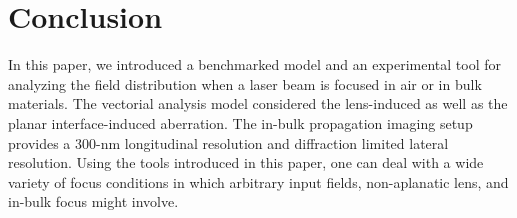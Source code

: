 \documentclass[9pt,twocolumn,twoside]{osajnl}
\begin{document}

\section{Conclusion}
In this paper, we introduced a benchmarked model and an experimental tool for analyzing the field distribution when a laser beam is focused in air or in bulk materials. The vectorial analysis model considered the lens-induced as well as the planar interface-induced aberration. The in-bulk propagation imaging setup provides a 300-nm longitudinal resolution and diffraction limited lateral resolution. Using the tools introduced in this paper, one can deal with a wide variety of focus conditions in which arbitrary input fields, non-aplanatic lens, and in-bulk focus might involve. 
\end{document}
